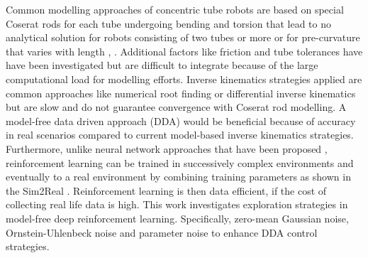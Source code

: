 Common modelling approaches of concentric tube robots are based on special Coserat rods for each tube undergoing bending and torsion that lead to no analytical solution for robots consisting of two tubes or more or for pre-curvature that varies with length \cite{Dupont2010}, \cite{Rucker2010}. Additional factors like friction and tube tolerances have have been investigated \cite{Lock2011} but are difficult to integrate because of the large computational load for modelling efforts. Inverse kinematics strategies applied are common approaches like numerical root finding \cite{Burgner2014} or differential inverse kinematics \cite{Dupont2010} but are slow and do not guarantee convergence with Coserat rod modelling. 
A model-free data driven approach (DDA) would be beneficial because of accuracy in real scenarios compared to current model-based inverse kinematics strategies. Furthermore, unlike neural network approaches that have been proposed \cite{Grassmann2018}, reinforcement learning can be trained in successively complex environments and eventually to a real environment by combining training parameters as shown in the Sim2Real \cite{OpenAI2018}. Reinforcement learning is then data efficient, if the cost of collecting real life data is high. This work investigates exploration strategies in model-free deep reinforcement learning. Specifically, zero-mean Gaussian noise, Ornstein-Uhlenbeck noise and parameter noise to enhance DDA control strategies.
